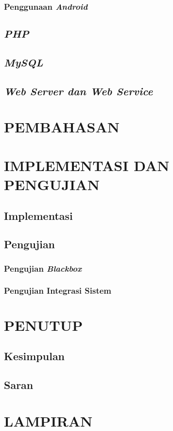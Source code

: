 \documentclass[bahasa, a4paper, 12pt]{report}
\begin{document}
			\subsection{Penggunaan \emph{Android}}
		\section{\emph{PHP}}
		\section{\emph{MySQL}}
		\section{\emph{Web Server dan Web Service}}
	\chapter{PEMBAHASAN}
	\chapter{IMPLEMENTASI DAN PENGUJIAN}
		\section{Implementasi}
		\section{Pengujian}
		\subsection{Pengujian \emph{Blackbox}}
		\subsection{Pengujian Integrasi Sistem}
	\chapter{PENUTUP}
		\section{Kesimpulan}
		\section{Saran}
	

	\chapter*{LAMPIRAN}
		\setcounter{chapter}{6}
\end{document}
